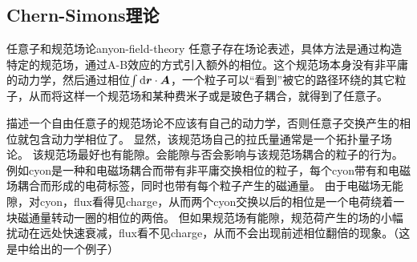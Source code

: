 \subsection{Chern-Simons理论}\label{sec:chern-simons-theory-fqhe}

\begin{back}{任意子和规范场论}{anyon-field-theory}
    任意子存在场论表述，具体方法是通过构造特定的规范场，通过A-B效应的方式引入额外的相位。这个规范场本身没有非平庸的动力学，然后通过相位$\int \dd{\vb*{r}} \cdot \vb*{A}$，一个粒子可以“看到”被它的路径环绕的其它粒子，从而将这样一个规范场和某种费米子或是玻色子耦合，就得到了任意子。

    描述一个自由任意子的规范场论不应该有自己的动力学，否则任意子交换产生的相位就包含动力学相位了。
    显然，该规范场自己的拉氏量通常是一个拓扑量子场论。
    该规范场最好也有能隙。会能隙与否会影响与该规范场耦合的粒子的行为。
    例如cyon是一种和电磁场耦合而带有非平庸交换相位的粒子，每个cyon带有和电磁场耦合而形成的电荷标签，同时也带有每个粒子产生的磁通量。
    由于电磁场无能隙，对cyon，flux看得见charge，从而两个cyon交换以后的相位是一个电荷绕着一块磁通量转动一圈的相位的两倍。
    但如果规范场有能隙，规范荷产生的场的小幅扰动在远处快速衰减，flux看不见charge，从而不会出现前述相位翻倍的现象。（这是\cite{viefers_anyons}中给出的一个例子）
\end{back}



